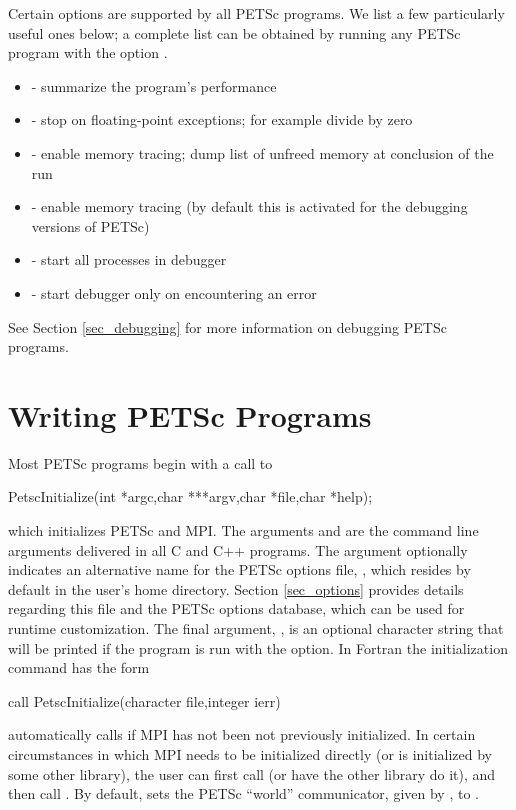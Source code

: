 Certain options are supported by all PETSc programs.  We list a few 
particularly useful ones below; a complete list can be obtained by 
running any PETSc program with the option .
\begin{itemize}
\item {} - summarize the program's performance
\item {} - stop on floating-point exceptions; 
      for example divide by zero
\item {} - enable memory tracing; dump list of unfreed memory 
      at conclusion  of the run
\item {} - enable memory tracing (by default this is 
      activated for the debugging versions of PETSc)
\item {}   
     - start all processes in debugger  
\item {}  
       - start debugger only on encountering an error
\end{itemize}
See Section \ref{sec_debugging} for more information on debugging PETSc programs.

\section{Writing PETSc Programs}
\label{sec_writing}

Most PETSc programs begin with a call to 
\begin{tabbing}
  PetscInitialize(int *argc,char ***argv,char *file,char *help);
\end{tabbing} 
which initializes PETSc and MPI.  The arguments  and 
 are the command line arguments delivered in all C and C++
programs.  The argument 
optionally indicates an alternative name for the PETSc options file,
, which resides by default in the user's home directory.
Section \ref{sec_options} provides details regarding
this file and the PETSc options database, which can be used for runtime
customization. The final argument, , is an optional
character string that will be printed if the program is run with the
 option.  In Fortran the initialization command has the form
\begin{tabbing}
   call PetscInitialize(character file,integer ierr)
\end{tabbing} 
 automatically calls  if MPI
has not been not previously initialized. In certain 
circumstances in which MPI needs to be initialized directly (or is
initialized by some other library), the user can first call 
 (or have the other library do it), and then call
.
By default,  sets the PETSc ``world''
communicator, given by , to .

